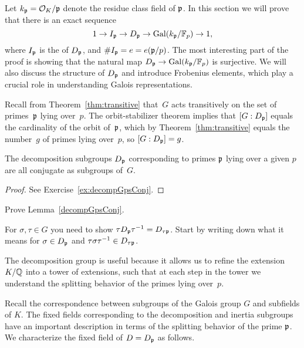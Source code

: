 Let $k_{\mathfrak{p}} = \mathcal{O}_K/\mathfrak{p}$ denote the residue class field of $\mathfrak{p}$.
In this section we will prove that there is an exact sequence
$$
  1\to I_{\mathfrak{p}} \to D_{\mathfrak{p}} \to \operatorname{Gal}(k_{\mathfrak{p}}/\mathbb{F}_p)\to 1,
$$
where $I_{\mathfrak{p}}$ is the  of $D_{\mathfrak{p}}$, and
$\#I_{\mathfrak{p}}=e = e(\mathfrak{p}/p)$.
The most interesting part of the proof is
showing that the natural map $D_{\mathfrak{p}}\to  \operatorname{Gal}(k_{\mathfrak{p}}/\mathbb{F}_p)$
is surjective. We will also discuss the structure of $D_{\mathfrak{p}}$ and introduce
Frobenius elements, which play a crucial role in understanding Galois
representations.


Recall from Theorem~\ref{thm:transitive}
that~$G$ acts transitively on the set of primes~$\mathfrak{p}$ lying
over~$p$.  The orbit-stabilizer theorem implies that $[G:D_{\mathfrak{p}}]$ equals the cardinality of the
orbit of~$\mathfrak{p}$, which by Theorem~\ref{thm:transitive}
equals the number~$g$ of primes lying over~$p$, so $[G:D_{\mathfrak{p}}]=g$.

\begin{lemma}\label{decompGpsConj}
The decomposition subgroups $D_{\mathfrak{p}}$ corresponding to primes $\mathfrak{p}$
lying over a given $p$ are all conjugate as subgroups of~$G$.
\end{lemma}
\begin{proof}
See Exercise~\ref{ex:decompGpsConj}.
\end{proof}

\begin{exercise}\label{ex:decompGpsConj}
Prove Lemma~\ref{decompGpsConj}.

\begin{hint}
	For $\sigma,\tau\in G$ you need to show
	$\tau D_{\mathfrak{p}} \tau^{-1} = D_{\tau\mathfrak{p}}$.
	Start by writing down what it means for $\sigma\in D_{\mathfrak{p}}$
	and $\tau\sigma\tau^{-1}\in D_{\tau\mathfrak{p}}$.
\end{hint}

\end{exercise}

The decomposition group is useful because it allows us
to refine the extension $K/\mathbb{Q}$ into a tower of extensions, such that at
each step in the tower we understand the splitting behavior
of the primes lying over~$p$.


Recall the correspondence between subgroups of the Galois group
$G$ and subfields of $K$. The fixed fields corresponding to the
decomposition and inertia subgroups have an important description
in terms of the splitting behavior of the prime $\mathfrak{p}$.
We characterize the fixed field of $D=D_{\mathfrak{p}}$ as follows.

